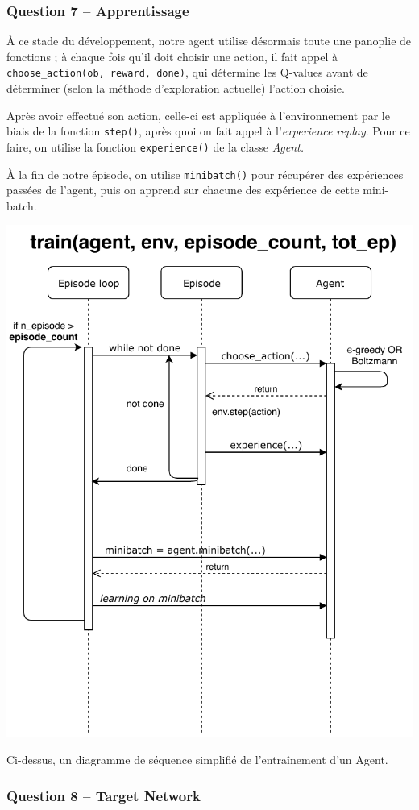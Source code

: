 \documentclass[12pt,french]{article}
\begin{document}
\subsubsection{Question 7 -- Apprentissage}

À ce stade du développement, notre agent utilise désormais toute une panoplie de fonctions ; à chaque fois qu'il doit choisir une action, il fait appel à \texttt{choose\_action(ob, reward, done)}, qui détermine les Q-values avant de déterminer (selon la méthode d'exploration actuelle) l'action choisie.

Après avoir effectué son action, celle-ci est appliquée à l'environnement par le biais de la fonction \texttt{step()}, après quoi on fait appel à l'\textit{experience replay}. Pour ce faire, on utilise la fonction \texttt{experience()} de la classe \textit{Agent.}

À la fin de notre épisode, on utilise \texttt{minibatch()} pour récupérer des expériences passées de l'agent, puis on apprend sur chacune des expérience de cette mini-batch.

\begin{center}
    \includegraphics[width=.7\textwidth]{../src/img/Q7.pdf}
\end{center}

Ci-dessus, un diagramme de séquence simplifié de l'entraînement d'un Agent.

\subsubsection{Question 8 -- Target Network}\label{target}
\end{document}
